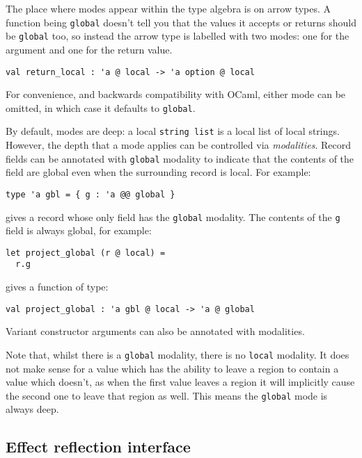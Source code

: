 \documentclass[acmsmall, screen, nonacm]{acmart}
\theoremstyle{definition}
\begin{document}
The place where modes appear within the type algebra is on arrow
types. A function being \lstinline[style=oxcaml]{global} doesn't tell you
that the values it accepts or returns should be
\lstinline[style=oxcaml]{global} too, so instead the arrow type is
labelled with two modes: one for the argument and one for the return
value.
\begin{lstlisting}[style=oxcaml]
val return_local : 'a @ local -> 'a option @ local
\end{lstlisting}
For convenience, and backwards compatibility with OCaml, either mode can
be omitted, in which case it defaults to
\lstinline[style=oxcaml]{global}.

By default, modes are deep: a local \lstinline[style=oxcaml]{string list}
is a local list of local strings. However, the depth that a mode applies
can be controlled via \emph{modalities}. Record fields can be annotated
with \lstinline[style=oxcaml]{global} modality to indicate that the
contents of the field are global even when the surrounding record is
local. For example:
\begin{lstlisting}[style=oxcaml]
type 'a gbl = { g : 'a @@ global }
\end{lstlisting}
gives a record whose only field has the \lstinline[style=oxcaml]{global}
modality. The contents of the \lstinline[style=oxcaml]{g} field is always
global, for example:
\begin{lstlisting}[style=oxcaml]
let project_global (r @ local) =
  r.g
\end{lstlisting}
gives a function of type:
\begin{lstlisting}[style=oxcaml]
val project_global : 'a gbl @ local -> 'a @ global
\end{lstlisting}
Variant constructor arguments can also be annotated with modalities.

Note that, whilst there is a \lstinline[style=oxcaml]{global} modality,
there is no \lstinline[style=oxcaml]{local} modality. It does not make
sense for a value which has the ability to leave a region to contain a
value which doesn't, as when the first value leaves a region it will
implicitly cause the second one to leave that region as well. This means
the \lstinline[style=oxcaml]{global} mode is always deep.

\subsection{Effect reflection interface}
\label{sec:interface}
\end{document}
